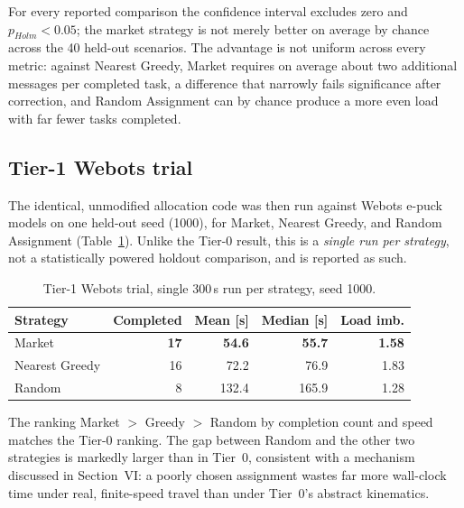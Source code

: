 \documentclass[conference]{IEEEtran}
\begin{document}
For every reported comparison the confidence interval excludes zero and
$p_{Holm}<0.05$; the market strategy is not merely better on average by
chance across the 40 held-out scenarios. The advantage is not uniform
across every metric: against Nearest Greedy, Market requires on average
about two additional messages per completed task, a difference that
narrowly fails significance after correction, and Random Assignment can
by chance produce a more even load with far fewer tasks completed.

\subsection{Tier-1 Webots trial}

The identical, unmodified allocation code was then run against Webots
e-puck models on one held-out seed (1000), for Market, Nearest Greedy,
and Random Assignment (Table~\ref{tab:tier1}). Unlike the Tier-0 result,
this is a \emph{single run per strategy}, not a statistically powered
holdout comparison, and is reported as such.

\begin{table}[t]
\centering
\caption{Tier-1 Webots trial, single 300\,s run per strategy, seed 1000.}
\label{tab:tier1}
\small
\begin{tabular}{@{}lrrrr@{}}
\toprule
Strategy & Completed & Mean [s] & Median [s] & Load imb.\\
\midrule
Market & \textbf{17} & \textbf{54.6} & \textbf{55.7} & \textbf{1.58}\\
Nearest Greedy & 16 & 72.2 & 76.9 & 1.83\\
Random & 8 & 132.4 & 165.9 & 1.28\\
\bottomrule
\end{tabular}
\end{table}

The ranking Market $>$ Greedy $>$ Random by completion count and speed
matches the Tier-0 ranking. The gap between Random and the other two
strategies is markedly larger than in Tier~0, consistent with a
mechanism discussed in Section~VI: a poorly chosen assignment wastes far
more wall-clock time under real, finite-speed travel than under Tier~0's
abstract kinematics.
\end{document}
